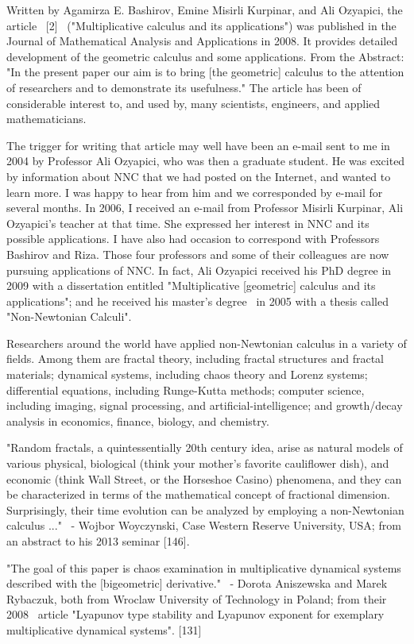 \documentclass[12pt]{article}
\begin{document}
Written by Agamirza E. Bashirov, Emine Misirli Kurpinar, and Ali Ozyapici, the article  [2]  ("Multiplicative calculus and its applications") was published in the Journal of Mathematical Analysis and Applications in 2008. It provides detailed development of the geometric calculus and some applications. From the Abstract: "In the present paper our aim is to bring [the geometric] calculus to the attention of researchers and to demonstrate its usefulness." The article has been of considerable interest to, and used by, many scientists, engineers, and applied mathematicians.

The trigger for writing that article may well have been an e-mail sent to me in 2004 by Professor Ali Ozyapici, who was then a graduate student. He was excited by information about NNC that we had posted on the Internet, and wanted to learn more. I was happy to hear from him and we corresponded by e-mail for several months. In 2006, I received an e-mail from Professor Misirli Kurpinar, Ali Ozyapici's teacher at that time. She expressed her interest in NNC and its possible applications. I have also had occasion to correspond with Professors Bashirov and Riza. Those four professors and some of their colleagues are now pursuing applications of NNC. In fact, Ali Ozyapici received his PhD degree in 2009 with a dissertation entitled "Multiplicative [geometric] calculus and its applications"; and he received his master's degree  in 2005 with a thesis called "Non-Newtonian Calculi".

Researchers around the world have applied non-Newtonian calculus in a variety of fields. Among them are fractal theory, including fractal structures and fractal materials; dynamical systems, including chaos theory and Lorenz systems; differential equations, including Runge-Kutta methods; computer science, including imaging, signal processing, and artificial-intelligence; and growth/decay analysis in economics, finance, biology, and chemistry.


"Random fractals, a quintessentially 20th century idea, arise as natural models of various physical, biological (think your mother's favorite cauliflower dish), and economic (think Wall Street, or the Horseshoe Casino) phenomena, and they can be characterized in terms of the mathematical concept of fractional dimension. Surprisingly, their time evolution can be analyzed by employing a non-Newtonian calculus ..."
 - Wojbor Woyczynski, Case Western Reserve University, USA; from an abstract to his 2013 seminar [146].

"The goal of this paper is chaos examination in multiplicative dynamical systems described with the [bigeometric] derivative."
 - Dorota Aniszewska and Marek Rybaczuk, both from Wroclaw University of Technology in Poland; from their 2008  article "Lyapunov type stability and Lyapunov exponent for exemplary multiplicative dynamical systems". [131]
\end{document}
